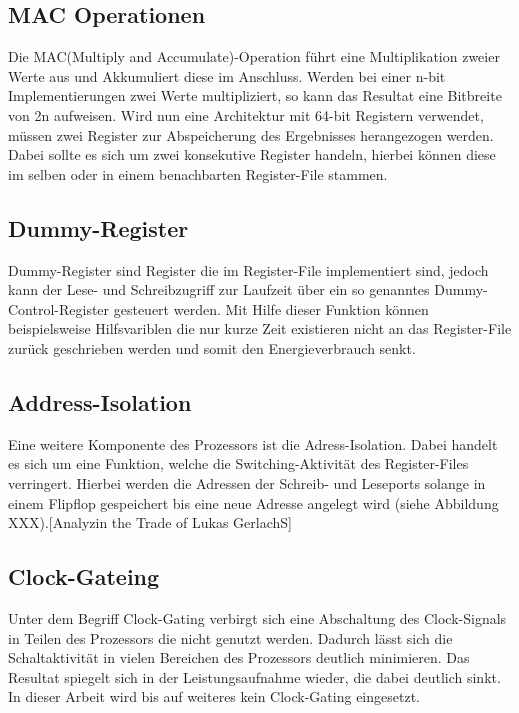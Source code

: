 \subsection{MAC Operationen}\label{subsec:macMode}
Die MAC(Multiply and Accumulate)-Operation führt eine Multiplikation zweier Werte aus und Akkumuliert diese im Anschluss. Werden bei einer n-bit Implementierungen zwei Werte multipliziert, so kann das Resultat eine Bitbreite von 2n aufweisen. Wird nun eine Architektur mit 64-bit Registern verwendet, müssen zwei Register zur Abspeicherung des Ergebnisses herangezogen werden. Dabei sollte es sich um zwei konsekutive Register handeln, hierbei können diese im selben oder in einem benachbarten Register-File stammen. 
  

\subsection{Dummy-Register}\label{subsec:dummy}
Dummy-Register sind Register die im Register-File implementiert sind, jedoch kann der Lese- und Schreibzugriff zur Laufzeit über ein so genanntes Dummy-Control-Register gesteuert werden. Mit Hilfe dieser Funktion können beispielsweise Hilfsvariblen die nur kurze Zeit existieren nicht an das Register-File zurück geschrieben werden und somit den Energieverbrauch senkt. 

\subsection{Address-Isolation}\label{subsec:add_iso}
Eine weitere Komponente des Prozessors ist die Adress-Isolation. Dabei handelt es sich um eine Funktion, welche die Switching-Aktivität des Register-Files verringert. Hierbei werden die Adressen der Schreib- und Leseports solange in einem Flipflop gespeichert bis eine neue Adresse angelegt wird (siehe Abbildung XXX).[Analyzin the Trade of Lukas GerlachS]

\subsection{Clock-Gateing}\label{subsec:clock-gate}
Unter dem Begriff Clock-Gating verbirgt sich eine Abschaltung des Clock-Signals in Teilen des Prozessors die nicht genutzt werden. Dadurch lässt sich die Schaltaktivität in vielen Bereichen des Prozessors deutlich minimieren. Das Resultat spiegelt sich in der Leistungsaufnahme wieder, die dabei deutlich sinkt. In dieser Arbeit wird bis auf weiteres kein Clock-Gating eingesetzt.


